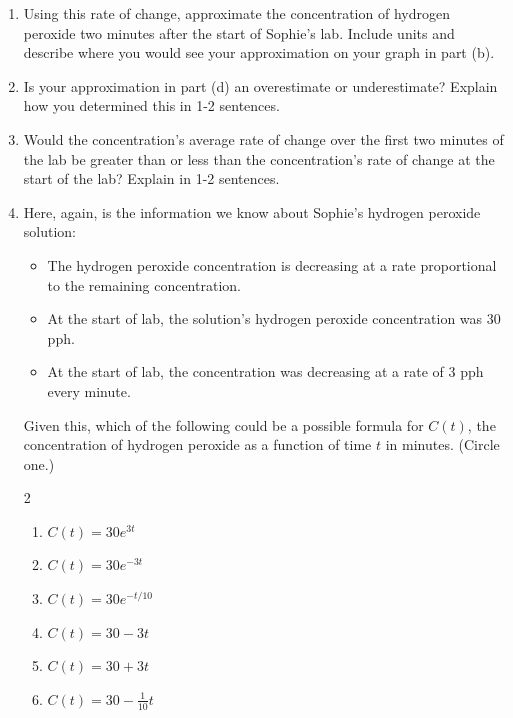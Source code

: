 \documentclass{article}
\begin{document}
\begin{enumerate}
\begin{enumerate}
    \item   \begin{problem}[\vfill]Using this rate of change, approximate the concentration of hydrogen peroxide two minutes after the start of Sophie's lab. Include units and describe where you would see your approximation on your graph in part (b).
    \end{problem}
    \item \begin{problem}[\vfill] Is your approximation in part (d) an overestimate or underestimate? Explain how you determined this in 1-2 sentences.\end{problem}
        \newpage
        \item \begin{problem}[\vfill]Would the concentration's average rate of change over the first two minutes of the lab be greater than or less than the concentration's rate of change at the start of the lab? Explain in 1-2 sentences.\end{problem}
        \item Here, again, is the information we know about Sophie's hydrogen peroxide solution:
        \begin{itemize}
            \item The hydrogen peroxide concentration is decreasing at a rate proportional to the remaining concentration.
            \item At the start of lab, the solution's hydrogen peroxide concentration was 30 pph.
            \item At the start of lab, the concentration was decreasing at a rate of 3 pph every minute.
        \end{itemize}
        Given this, which of the following could be a possible formula for $C(t)$, the concentration of hydrogen peroxide as a function of time $t$ in minutes. (Circle one.)
        \begin{multicols}{2}
        \begin{enumerate}
            \item $\displaystyle C(t) = 30e^{3t}$
            \item $\displaystyle C(t) = 30e^{-3t}$
            \item $\displaystyle C(t) = 30e^{-t/10}$
            \item $\displaystyle C(t) = 30-3t$
            \item $\displaystyle C(t) = 30+ 3t$
            \item $\displaystyle C(t) = 30-\frac{1}{10} t$

\end{enumerate}
\end{multicols}
\end{enumerate}
\end{enumerate}
\end{document}
